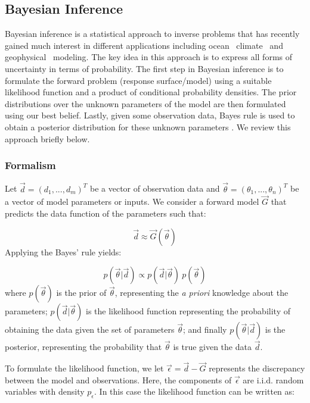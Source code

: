 \subsection{Bayesian Inference}
 \label{sec:inference}
 
Bayesian inference is a statistical approach to inverse problems
that has recently gained much interest in different applications including
ocean~\citep{Alexanderian2011a,Zedler2012,sraj:2013a}
climate~\citep{OlsonEtAl2012} and geophysical~\citep{Malinverno2002} modeling.
The key idea in this approach is to express all forms of uncertainty
in terms of probability. The first step in Bayesian inference 
is to formulate the forward problem (response surface/model) using 
a suitable likelihood function and a product of conditional probability densities. 
The prior distributions over the unknown parameters of the model
are then formulated using our best belief. Lastly, given some observation data, Bayes rule 
is used to obtain a posterior distribution for these unknown parameters
\citep{sivia}. We review this approach briefly below.
\subsubsection{Formalism}

Let $\vec{d}=(d_1,...,d_m)^T$ be a vector of observation data and $\vec{\theta}=(\theta_1,...,\theta_n)^T$ be a vector of model parameters or inputs. We consider a forward model $\vec G$ that predicts the data function of 
the parameters such that:

\begin{equation}
\vec d \approx \vec{G}( \vec \theta)
\end{equation}
Applying the Bayes' rule yields:

\begin{equation}
 p(\vec{\theta}| \vec d) \propto 
 p(\vec d | \vec{\theta}) \ p(\vec{\theta})  
\label{eq:bayes}
\end{equation}
where $p(\vec{\theta})$ is the prior of $\vec{\theta}$, representing the \emph{a priori} knowledge
about the parameters; 
$p(\vec d| \vec{\theta})$ is the likelihood function representing
the probability of obtaining the data given the set of parameters $\vec{\theta}$;
and finally $p(\vec{\theta}| \vec d)$ is the posterior,
representing the probability that $\vec{\theta}$ is true given the data $\vec d $.

To formulate the likelihood function, we let $\vec \epsilon = \vec d - \vec{G}$
represents the discrepancy between the model and observations.
Here, the components of $\vec \epsilon $ are i.i.d. random variables with density $p_{\epsilon}$.
In this case the likelihood function can be written as:

